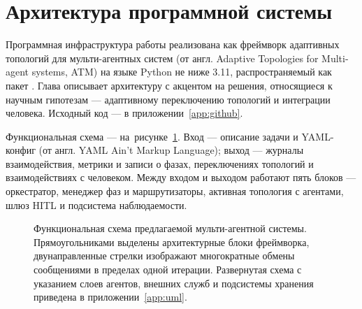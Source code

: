 
\section{Архитектура программной системы}
\label{sec:architecture}

Программная инфраструктура работы реализована как фреймворк
адаптивных топологий для мульти-агентных систем
(от англ. Adaptive Topologies for Multi-agent systems, ATM)
на языке Python не ниже 3.11, распространяемый как пакет .
Глава описывает архитектуру с акцентом на решения, относящиеся к
научным гипотезам --- адаптивному переключению топологий и
интеграции человека. Исходный код --- в приложении~\ref{app:github}.

Функциональная схема --- на~рисунке~\ref{fig:arch:functional}. Вход ---
описание задачи и YAML-конфиг
(от англ. YAML Ain't Markup Language); выход --- журналы
взаимодействия, метрики и записи о фазах, переключениях топологий
и взаимодействиях с человеком. Между входом и выходом работают
пять блоков --- оркестратор, менеджер фаз и маршрутизаторы, активная
топология с агентами, шлюз HITL и подсистема наблюдаемости.

\begin{figure}[!htbp]
\centering
{}
\caption{Функциональная схема предлагаемой мульти-агентной системы.
Прямоугольниками выделены архитектурные блоки фреймворка,
двунаправленные стрелки изображают многократные обмены сообщениями
в пределах одной итерации. Развернутая схема с указанием слоев
агентов, внешних служб и подсистемы хранения приведена в
приложении~\ref{app:uml}.}
\label{fig:arch:functional}
\end{figure}

